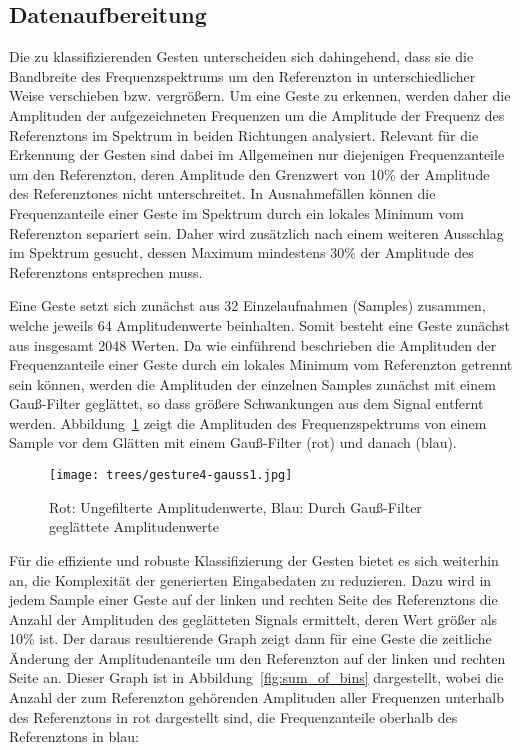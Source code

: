 \subsection{Datenaufbereitung}
\label{sect:Trees_Datenaufbereitung}
Die zu klassifizierenden Gesten unterscheiden sich dahingehend, dass sie die Bandbreite 
des Frequenzspektrums um den Referenzton in unterschiedlicher Weise verschieben bzw. vergrößern. 
Um eine Geste zu erkennen, werden daher die Amplituden der aufgezeichneten Frequenzen 
um die Amplitude der Frequenz des Referenztons im Spektrum in beiden Richtungen analysiert. 
Relevant für die Erkennung der Gesten sind dabei im Allgemeinen nur diejenigen Frequenzanteile 
um den Referenzton, deren Amplitude den Grenzwert von 10\% der Amplitude des Referenztones nicht unterschreitet. 
In Ausnahmefällen können die Frequenzanteile einer Geste im Spektrum durch ein lokales Minimum vom Referenzton 
separiert sein. Daher wird zusätzlich nach einem weiteren Ausschlag im Spektrum gesucht, 
dessen Maximum mindestens 30\% der Amplitude des Referenztons entsprechen muss.


Eine Geste setzt sich zunächst aus 32 Einzelaufnahmen (Samples) zusammen, welche jeweils 
64 Amplitudenwerte beinhalten. Somit besteht eine Geste zunächst aus insgesamt 2048 Werten.
Da wie einführend beschrieben die Amplituden der Frequenzanteile einer Geste durch ein lokales Minimum vom Referenzton 
getrennt sein können, werden die Amplituden der einzelnen Samples zunächst mit einem Gauß-Filter geglättet, 
so dass größere Schwankungen aus dem Signal entfernt werden. 
Abbildung~\ref{fig:gauss} zeigt die Amplituden des Frequenzspektrums von einem Sample 
vor dem Glätten mit einem Gauß-Filter (rot) und danach (blau).

\begin{figure}[htbp] \centering
\texttt{[image: trees/gesture4-gauss1.jpg]}
\caption{Rot: Ungefilterte Amplitudenwerte, Blau: Durch Gauß-Filter geglättete Amplitudenwerte}
\label{fig:gauss}
\end{figure}

Für die effiziente und robuste Klassifizierung der Gesten bietet es sich weiterhin an, 
die Komplexität der generierten Eingabedaten zu reduzieren. Dazu wird in jedem Sample einer Geste 
auf der linken und rechten Seite des Referenztons die Anzahl der Amplituden des geglätteten Signals ermittelt, 
deren Wert größer als 10\% ist. Der daraus resultierende Graph zeigt dann für eine Geste die zeitliche 
Änderung der Amplitudenanteile um den Referenzton auf der linken und rechten Seite an. Dieser Graph ist in Abbildung~\ref{fig:sum_of_bins} dargestellt, wobei die Anzahl der zum Referenzton gehörenden Amplituden aller Frequenzen unterhalb des
Referenztons in rot dargestellt sind, die Frequenzanteile oberhalb des Referenztons in blau:

